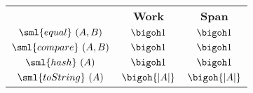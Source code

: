 \begin{costspec}[IntElt]

\begin{tabular}{c|c|c}
& \textbf{Work} & \textbf{Span} \\
$\sml{equal}~(A,B)$ & $\bigoh 1$ & $\bigoh 1$ \\
$\sml{compare}~(A,B)$ & $\bigoh 1$ & $\bigoh 1$ \\
$\sml{hash}~(A)$ & $\bigoh 1$ & $\bigoh 1$ \\
$\sml{toString}~(A)$ & $\bigoh{|A|}$ & $\bigoh{|A|}$ \\
\end{tabular}
\end{costspec}
    
